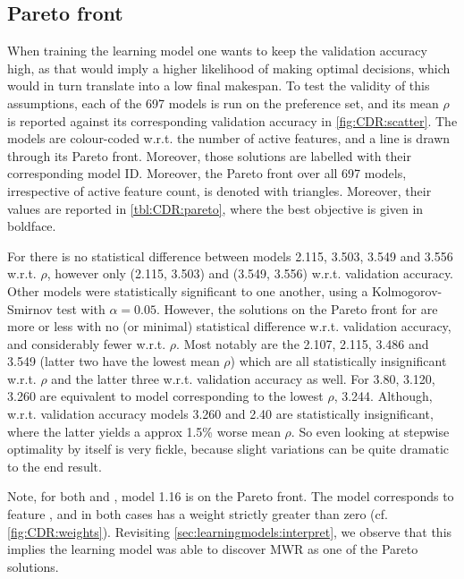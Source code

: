 \documentclass[smallextended]{svjour3}
\begin{document}
\subsection{Pareto front}\label{sec:CDR:pareto}
When training the learning model one wants to keep the validation accuracy 
high, as that would imply a higher likelihood of making optimal decisions, 
which would in turn translate into a low final makespan. To test the validity 
of this assumptions, each of the 697 models is run on the preference set, and 
its mean $\rho$ is reported against its corresponding validation accuracy in 
\cref{fig:CDR:scatter}. The models are colour-coded w.r.t. the number of active 
features, and a line is drawn through its Pareto front. Moreover, those 
solutions are labelled with their corresponding model ID. Moreover, the Pareto 
front over all 697 models, irrespective of active feature count, is denoted 
with triangles. Moreover, their values are reported in \cref{tbl:CDR:pareto}, 
where the best objective is given in boldface. 

For   there is no statistical difference between models 2.115, 
3.503, 3.549 and 3.556 w.r.t. $\rho$, however only (2.115, 3.503) and (3.549, 
3.556) w.r.t. validation accuracy. Other models were statistically significant 
to one another, using a Kolmogorov-Smirnov test with 
$\alpha=0.05$.\label{sec:expr:ks} 
However, the solutions on the Pareto front for  are more or less 
with no (or minimal) statistical difference w.r.t. validation accuracy, and 
considerably fewer w.r.t. $\rho$. Most notably are the 	2.107, 2.115, 3.486 
and 3.549 (latter two have the lowest mean $\rho$) which are all statistically 
insignificant w.r.t. $\rho$ and the latter three w.r.t. validation accuracy as 
well. 
For  3.80, 3.120, 3.260 are equivalent to model corresponding to 
the lowest $\rho$, 3.244. Although, w.r.t. validation accuracy models 3.260 and 
2.40 are statistically insignificant, where the latter yields a approx 1.5\% 
worse mean $\rho$. So even looking at stepwise optimality by itself is very 
fickle, because slight variations can be quite dramatic to the end result. 

Note, for both  and , model 1.16 is on the Pareto 
front. The model corresponds to feature \phijobWrm, and in both cases has a 
weight strictly greater than zero (cf. \cref{fig:CDR:weights}). Revisiting 
\cref{sec:learningmodels:interpret}, we observe that this implies the learning 
model was able to discover MWR as one of the Pareto solutions. 
\end{document}

